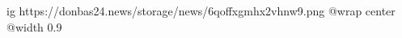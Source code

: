  
 
 
 
 

\ifcmt
  ig https://donbas24.news/storage/news/6qoffxgmhx2vhnw9.png
  @wrap center
  @width 0.9
\fi
